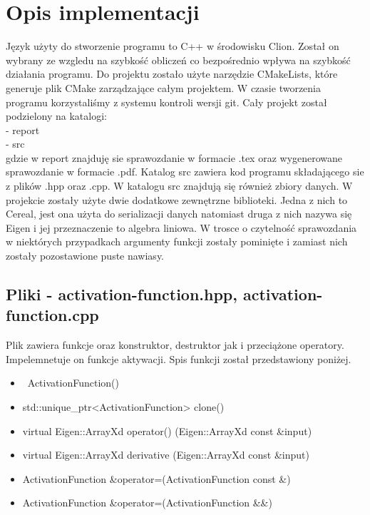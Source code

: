 \documentclass{classrep}
\begin{document}
    \section{Opis implementacji}
    {
        Język użyty do stworzenie programu to C++ w środowisku Clion. Został on wybrany ze
        wzgledu na szybkość obliczeń co bezpośrednio wpływa na szybkość działania programu.
        Do projektu zostało użyte narzędzie CMakeLists, które generuje plik CMake zarządzające
        całym projektem. W czasie tworzenia programu korzystaliśmy z systemu kontroli wersji git.
        Cały projekt został podzielony na katalogi:\\
        - report\\
        - src\\
        gdzie w report znajduję sie sprawozdanie w formacie .tex oraz wygenerowane sprawozdanie
        w formacie .pdf. Katalog src zawiera kod programu składającego sie z plików .hpp oraz .cpp.
        W katalogu src znajdują się również zbiory danych. W projekcie zostały użyte dwie dodatkowe
        zewnętrzne biblioteki. Jedna z nich to Cereal, jest ona użyta do serializacji danych natomiast
        druga z nich nazywa się Eigen i jej przeznaczenie to algebra liniowa. W trosce o czytelność
        sprawozdania w niektórych przypadkach argumenty funkcji zostały pominięte i zamiast nich
        zostały pozostawione puste nawiasy.

        \subsection{Pliki - activation-function.hpp, activation-function.cpp}
        {
            Plik zawiera funkcje oraz konstruktor, destruktor jak i przeciążone operatory.
            Impelemnetuje on funkcje aktywacji.
            Spis funkcji został przedstawiony poniżej.
            \begin{itemize}
                \item ~ActivationFunction()
                \item std::unique\_ptr<ActivationFunction> clone()
                \item virtual Eigen::ArrayXd operator() (Eigen::ArrayXd const \&input)
                \item virtual Eigen::ArrayXd derivative (Eigen::ArrayXd const \&input)
                \item ActivationFunction \&operator=(ActivationFunction const \&)
                \item ActivationFunction \&operator=(ActivationFunction \&\&)
            \end{itemize}
        }

}
\end{document}
